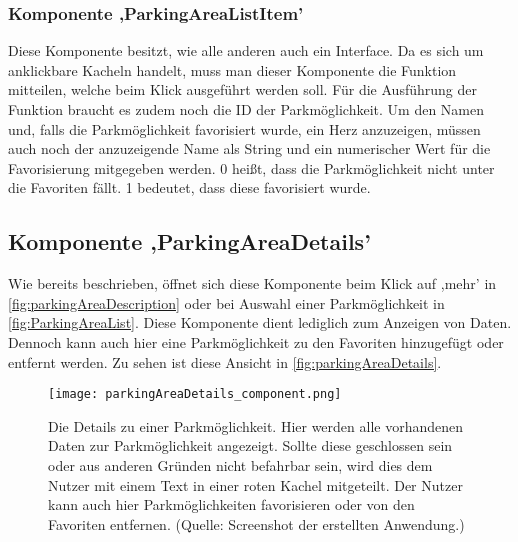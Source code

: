 \subsubsection{Komponente ,ParkingAreaListItem'}
\label{parkingAreaListItem}
Diese Komponente besitzt, wie alle anderen auch ein Interface. Da es sich um anklickbare Kacheln handelt, muss man dieser Komponente die Funktion mitteilen, welche beim Klick ausgeführt werden soll. Für die Ausführung der Funktion braucht es zudem noch die ID der Parkmöglichkeit. Um den Namen und, falls die Parkmöglichkeit favorisiert wurde, ein Herz anzuzeigen, müssen auch noch der anzuzeigende Name als String und ein numerischer Wert für die Favorisierung mitgegeben werden. 0 heißt, dass die Parkmöglichkeit nicht unter die Favoriten fällt. 1 bedeutet, dass diese favorisiert wurde.

\subsection{Komponente ,ParkingAreaDetails'}
\label{parkingAreaDetails}
Wie bereits beschrieben, öffnet sich diese Komponente beim Klick auf ,mehr' in \autoref{fig:parkingAreaDescription} oder bei Auswahl einer Parkmöglichkeit in \autoref{fig:ParkingAreaList}. Diese Komponente dient lediglich zum Anzeigen von Daten. Dennoch kann auch hier eine Parkmöglichkeit zu den Favoriten hinzugefügt oder entfernt werden. Zu sehen ist diese Ansicht in \autoref{fig:parkingAreaDetails}.

\begin{figure}[h!]
	\centering
	\texttt{[image: parkingAreaDetails\_component.png]}
	\caption[Die Details zu einer Parkmöglichkeit. Hier werden alle vorhandenen Daten zur Parkmöglichkeit angezeigt. Sollte diese geschlossen sein oder aus anderen Gründen nicht befahrbar sein, wird dies dem Nutzer mit einem Text in einer roten Kachel mitgeteilt. Der Nutzer kann auch hier Parkmöglichkeiten favorisieren oder von den Favoriten entfernen.]
	{Die Details zu einer Parkmöglichkeit. Hier werden alle vorhandenen Daten zur Parkmöglichkeit angezeigt. Sollte diese geschlossen sein oder aus anderen Gründen nicht befahrbar sein, wird dies dem Nutzer mit einem Text in einer roten Kachel mitgeteilt. Der Nutzer kann auch hier Parkmöglichkeiten favorisieren oder von den Favoriten entfernen. (Quelle: Screenshot der erstellten Anwendung.)}
	\label{fig:parkingAreaDetails}
\end{figure}

